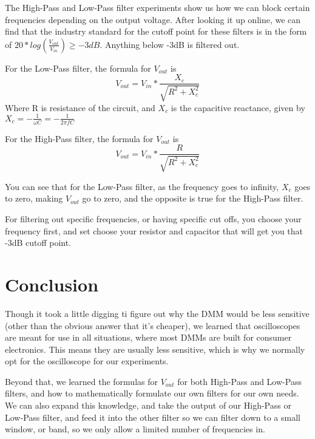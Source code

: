 \documentclass[%
 aip,
 jmp,
 amsmath,
 amssymb,
 reprint,%
 numerical,
 longbibliography,
]{revtex4-1}
\begin{document}
	The High-Pass and Low-Pass filter experiments show us how we can block certain frequencies
	depending on the output voltage. After looking it up online, we can find that the industry
	standard for the cutoff point for these filters is in the form of 
	$20*log(\frac{V_{out}}{V_{in}}) \geq -3dB$. Anything below -3dB is filtered out.
	
	For the Low-Pass filter, the formula for $V_{out}$ is 
	\[ V_{out} = V_{in}*\frac{X_c}{\sqrt{R^2+X_c^2}} \]
	Where R is resistance of the circuit, and $X_c$ is the capacitive reactance, given by
	$X_c = -\frac{1}{\omega C} = -\frac{1}{2\pi fC}$
	
	For the High-Pass filter, the formula for $V_{out}$ is
	\[ V_{out} = V_{in}*\frac{R}{\sqrt{R^2+X_c^2}} \]
	
	You can see that for the Low-Pass filter, as the frequency goes to infinity, $X_c$ goes
	to zero, making $V_{out}$ go to zero, and the opposite is true for the High-Pass filter.
	
	For filtering out specific frequencies, or having specific cut offs, you choose your
	frequency first, and set choose your resistor and capacitor that will get you that -3dB
	cutoff point.

\section{Conclusion}

Though it took a little digging ti figure out why the DMM would be less sensitive (other than
the obvious answer that it's cheaper), we learned that oscilloscopes are meant for use in all
situations, where most DMMs are built for consumer electronics. This means they are usually
less sensitive, which is why we normally opt for the oscilloscope for our experiments. 

Beyond that, we learned the formulas for $V_{out}$ for both High-Pass and Low-Pass filters,
and how to mathematically formulate our own filters for our own needs. We can also expand this
knowledge, and take the output of our High-Pass or Low-Pass filter, and feed it into the other
filter so we can filter down to a small window, or band, so we only allow a limited number of
frequencies in.
\end{document}

